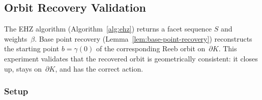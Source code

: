 %
%

\subsection{Orbit Recovery Validation}
\label{sec:orbit-recovery}

The EHZ algorithm (Algorithm~\ref{alg:ehz}) returns a facet
sequence $S$ and weights~$\beta$.
Base point recovery (Lemma~\ref{lem:base-point-recovery}) reconstructs
the starting point $b = \gamma(0)$ of the corresponding Reeb orbit
on~$\partial K$. This experiment validates that the recovered orbit is
geometrically consistent: it closes up, stays on~$\partial K$, and has
the correct action.

\subsubsection*{Setup}

